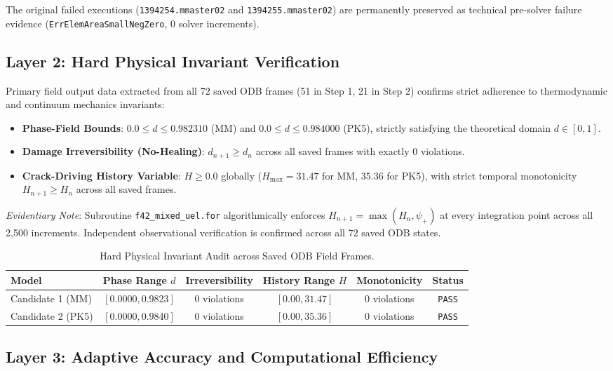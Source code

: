 The original failed executions (\texttt{1394254.mmaster02} and \texttt{1394255.mmaster02}) are permanently preserved as technical pre-solver failure evidence (\texttt{ErrElemAreaSmallNegZero}, 0 solver increments).

\subsection{Layer 2: Hard Physical Invariant Verification}
Primary field output data extracted from all 72 saved ODB frames (51 in Step 1, 21 in Step 2) confirms strict adherence to thermodynamic and continuum mechanics invariants:
\begin{itemize}
    \item \textbf{Phase-Field Bounds}: $0.0 \le d \le 0.982310$ (MM) and $0.0 \le d \le 0.984000$ (PK5), strictly satisfying the theoretical domain $d \in [0, 1]$.
    \item \textbf{Damage Irreversibility (No-Healing)}: $d_{n+1} \ge d_n$ across all saved frames with exactly 0 violations.
    \item \textbf{Crack-Driving History Variable}: $H \ge 0.0$ globally ($H_{\max} = 31.47$ for MM, $35.36$ for PK5), with strict temporal monotonicity $H_{n+1} \ge H_n$ across all saved frames.
\end{itemize}
\noindent\textit{Evidentiary Note}: Subroutine \texttt{f42\_mixed\_uel.for} algorithmically enforces $H_{n+1} = \max(H_n, \psi_+)$ at every integration point across all 2,500 increments. Independent observational verification is confirmed across all 72 saved ODB states.

\begin{table}[htbp]
\centering
\small
\caption{Hard Physical Invariant Audit across Saved ODB Field Frames.}
\label{tab:stage_g_hard_invariants}
\begin{tabular}{lccccc}
\toprule
\textbf{Model} & \textbf{Phase Range} $d$ & \textbf{Irreversibility} & \textbf{History Range} $H$ & \textbf{Monotonicity} & \textbf{Status} \\
\midrule
Candidate 1 (MM) & $[0.0000, 0.9823]$ & 0 violations & $[0.00, 31.47]$ & 0 violations & \texttt{PASS} \\
Candidate 2 (PK5) & $[0.0000, 0.9840]$ & 0 violations & $[0.00, 35.36]$ & 0 violations & \texttt{PASS} \\
\bottomrule
\end{tabular}
\end{table}

\subsection{Layer 3: Adaptive Accuracy and Computational Efficiency}

